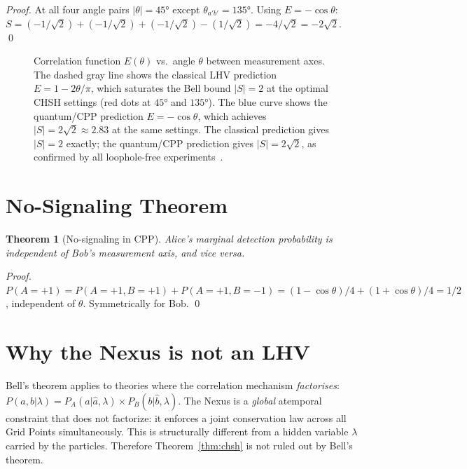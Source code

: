 \documentclass[11pt,a4paper]{article}
\newtheorem{theorem}{Theorem}[section]
\begin{document}
\begin{proof}
At all four angle pairs $|\theta| = 45°$ except $\theta_{a'b'} = 135°$.
Using $E = -\cos\theta$: $S = (-1/\sqrt{2}) + (-1/\sqrt{2}) + (-1/\sqrt{2})
- (1/\sqrt{2}) = -4/\sqrt{2} = -2\sqrt{2}$. \qed
\end{proof}

\begin{figure}[H]
\centering

\caption{Correlation function $E(\theta)$ vs.\ angle $\theta$ between
  measurement axes.  The dashed gray line shows the classical LHV
  prediction $E = 1 - 2\theta/\pi$, which saturates the Bell bound
  $|S| = 2$ at the optimal CHSH settings (red dots at $45°$ and $135°$).
  The blue curve shows the quantum/CPP prediction $E = -\cos\theta$,
  which achieves $|S| = 2\sqrt{2} \approx 2.83$ at the same settings.
  The classical prediction gives $|S| = 2$ exactly; the quantum/CPP
  prediction gives $|S| = 2\sqrt{2}$, as confirmed by all loophole-free
  experiments~\cite{hensen2015,giustina2015}.}
\label{fig:chsh}
\end{figure}

\section{No-Signaling Theorem}

\begin{theorem}[No-signaling in CPP]
\label{thm:nosig}
Alice's marginal detection probability is independent of Bob's
measurement axis, and vice versa.
\end{theorem}

\begin{proof}
$P(A{=}+1) = P(A{=}+1,B{=}+1) + P(A{=}+1,B{=}-1)
= (1-\cos\theta)/4 + (1+\cos\theta)/4 = 1/2$, independent of $\theta$.
Symmetrically for Bob. \qed
\end{proof}

\section{Why the Nexus is not an LHV}

Bell's theorem applies to theories where the correlation mechanism
\emph{factorises}: $P(a,b|\lambda) = P_A(a|\hat{a},\lambda)
\times P_B(b|\hat{b},\lambda)$.  The Nexus is a \emph{global}
atemporal constraint that does not factorize: it enforces a joint
conservation law across all Grid Points simultaneously.  This is
structurally different from a hidden variable $\lambda$ carried by
the particles.  Therefore Theorem~\ref{thm:chsh} is not ruled out
by Bell's theorem.
\end{document}
